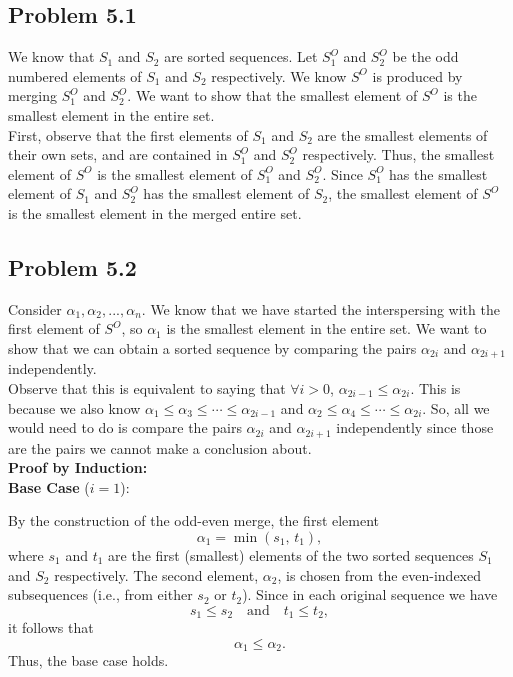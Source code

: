 \documentclass[a4paper]{article}
\begin{document}
\subsection*{Problem 5.1}
We know that $S_1$ and $S_2$ are sorted sequences. Let $S_1^O$ and $S_2^O$ be the odd numbered elements of $S_1$ and $S_2$ respectively. We know $S^O$ is produced by merging $S_1^O$ and $S_2^O$. We want to show that the smallest element of $S^O$ is the smallest element in the entire set.\\

\noindent First, observe that the first elements of $S_1$ and $S_2$ are the smallest elements of their own sets, and are contained in $S_1^O$ and $S_2^O$ respectively. Thus, the smallest element of $S^O$ is the smallest element of $S_1^O$ and $S_2^O$. Since $S_1^O$ has the smallest element of $S_1$ and $S_2^O$ has the smallest element of $S_2$, the smallest element of $S^O$ is the smallest element in the merged entire set.\\


\subsection*{Problem 5.2}
Consider $\alpha_1, \alpha_2, ..., \alpha_n$. We know that we have started the interspersing with the first element of $S^O$, so $\alpha_1$ is the smallest element in the entire set. We want to show that we can obtain a sorted sequence by comparing the pairs $\alpha_{2i}$ and $\alpha_{2i+1}$ independently.\\


\noindent Observe that this is equivalent to saying that $\forall i > 0$, $\alpha_{2i - 1} \leq \alpha_{2i}$. This is because we also know $\alpha_1 \leq \alpha_3 \leq \cdots \leq \alpha_{2i - 1}$ and $\alpha_2 \leq \alpha_4 \leq \cdots \leq \alpha_{2i}$. So, all we would need to do is compare the pairs $\alpha_{2i}$ and $\alpha_{2i + 1}$ independently since those are the pairs we cannot make a conclusion about.\\


\noindent \textbf{Proof by Induction:}\\

\noindent \textbf{Base Case} ($i = 1$):

\noindent By the construction of the odd-even merge, the first element
\[
\alpha_1 = \min(s_1,\, t_1),
\]
where \( s_1 \) and \( t_1 \) are the first (smallest) elements of the two sorted sequences \( S_1 \) and \( S_2 \) respectively. The second element, \( \alpha_2 \), is chosen from the even-indexed subsequences (i.e., from either \( s_2 \) or \( t_2 \)). Since in each original sequence we have
\[
s_1 \le s_2 \quad \text{and} \quad t_1 \le t_2,
\]
it follows that
\[
\alpha_1 \le \alpha_2.
\]
Thus, the base case holds.\\
\end{document}
